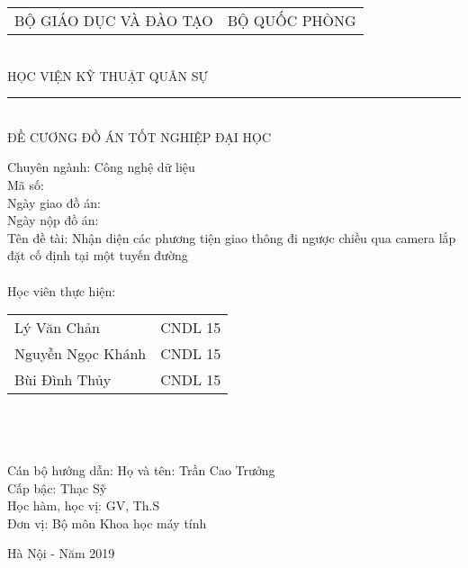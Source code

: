 \begin{center}
\vfill
\begin{tabular*}{0.8\linewidth}{@{\extracolsep{\fill}}cc}
	\large BỘ GIÁO DỤC VÀ ĐÀO TẠO  & \large BỘ QUỐC PHÒNG \\
\end{tabular*}
\\
\large HỌC VIỆN KỸ THUẬT QUÂN SỰ
\\
\rule{200px}{1px}\\
ĐỀ CƯƠNG ĐỒ ÁN TỐT NGHIỆP ĐẠI HỌC \\

\end{center}
\vfill
Chuyên ngành: Công nghệ dữ liệu\\
Mã số:\\
Ngày giao đồ án:\\
Ngày nộp đồ án:\\
Tên đề tài: Nhận diện các phương tiện giao thông đi ngược chiều qua camera lắp đặt cố định tại một tuyến đường\\ \\
Học viên thực hiện:
\smallbreak
\begin{tabularx}{\linewidth}{l l}
	 Lý Văn Chản  & CNDL 15\\
	 Nguyễn Ngọc Khánh  & CNDL 15\\
	 Bùi Đình Thủy  &  CNDL 15\\
\end{tabularx}\\\\\\
Cán bộ hướng dẫn:
Họ và tên: Trần Cao Trưởng\\
Cấp bậc: Thạc Sỹ\\
Học hàm, học vị: GV, Th.S\\
Đơn vị: Bộ môn Khoa học máy tính

\vfill
\begin{center}
Hà Nội - Năm 2019
\end{center}

